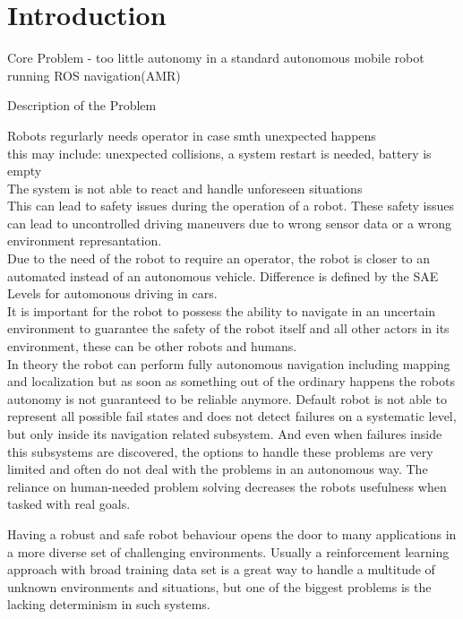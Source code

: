 \chapter{Introduction}
\label{cha:introduction}



Core Problem - too little autonomy in a standard autonomous mobile robot running ROS navigation(AMR)

Description of the Problem

Robots regurlarly needs operator in case smth unexpected happens\\

this may include: unexpected collisions, a system restart is needed, battery is empty\\

The system is not able to react and handle unforeseen situations\\

This can lead to safety issues during the operation of a robot. These safety issues can lead to uncontrolled driving maneuvers due to wrong sensor data or a wrong environment represantation.\\

Due to the need of the robot to require an operator, the robot is closer to an automated instead of an autonomous vehicle. 
Difference is defined by the SAE Levels for automonous driving in cars.\\

It is important for the robot to possess the ability to navigate in an uncertain environment to guarantee the safety of the robot itself and all other actors in its environment, these can be other robots and humans.\\

In theory the robot can perform fully autonomous navigation including mapping and localization but as soon as something out of the ordinary happens the robots autonomy is not guaranteed to be reliable anymore.
Default robot is not able to represent all possible fail states and does not detect failures on a systematic level, but only inside its navigation related subsystem. And even when failures inside this subsystems are discovered, the options to handle these problems are very limited and often do not deal with the problems in an autonomous way. The reliance on human-needed problem solving decreases the robots usefulness when tasked with real goals. 

Having a robust and safe robot behaviour opens the door to many applications in a more diverse set of challenging environments. Usually a reinforcement learning approach with broad training data set is a great way to handle a multitude of unknown environments and situations, but one of the biggest problems is the lacking determinism in such systems.


